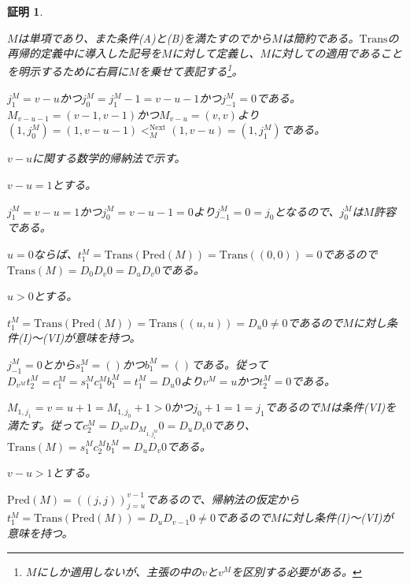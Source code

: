 \documentclass[dvipdfmx,uplatex]{jsarticle}
\theoremstyle{customnonumberbreakfortheorem}
\theoremstyle{customnonumberbreakforproof}
\newtheorem{hideableproof}{証明}
\begin{document}
\begin{hideableproof}
	\begin{indented}
		\item \(M\)は単項であり、また条件(A)と(B)を満たすのでから\(M\)は簡約である。\(\textrm{Trans}\)の再帰的定義中に導入した記号を\(M\)に対して定義し、\(M\)に対しての適用であることを明示するために右肩に\(M\)を乗せて表記する\footnote{\(M\)にしか適用しないが、主張の中の\(v\)と\(v^M\)を区別する必要がある。}。
		\item \(j_1^M = v-u\)かつ\(j_0^M = j_1^M-1 = v-u-1\)かつ\(j_{-1}^M = 0\)である。\(M_{v-u-1} = (v-1,v-1)\)かつ\(M_{v-u} = (v,v)\)より\((1,j_0^M) = (1,v-u-1) <_M^{\textrm{Next}} (1,v-u) = (1,j_1^M)\)である。
		\item \(v-u\)に関する数学的帰納法で示す。
		\item \(v-u = 1\)とする。
		\begin{indented}
			\item \(j_1^M = v-u = 1\)かつ\(j_0^M = v-u-1 = 0\)より\(j_{-1}^M = 0 = j_0\)となるので、\(j_0^M\)は\(M\)許容である。
			\item \(u = 0\)ならば、\(t_1^M = \textrm{Trans}(\textrm{Pred}(M)) = \textrm{Trans}((0,0)) = 0\)であるので\(\textrm{Trans}(M) = D_0 D_v 0 = D_u D_v 0\)である。
			\item \(u > 0\)とする。
			\begin{indented}
				\item \(t_1^M = \textrm{Trans}(\textrm{Pred}(M)) = \textrm{Trans}((u,u)) = D_u 0 \neq 0\)であるので\(M\)に対し条件(I)～(VI)が意味を持つ。
				\item \(j_{-1}^M = 0\)とから\(s_1^M = ()\)かつ\(b_1^M = ()\)である。従って\(D_{v^M} t_2^M = c_1^M = s_1^M c_1^M b_1^M = t_1^M = D_u 0\)より\(v^M = u\)かつ\(t_2^M = 0\)である。
				\item \(M_{1,j_1} = v = u+1 = M_{1,j_0}+1 > 0\)かつ\(j_0+1 = 1 = j_1\)であるので\(M\)は条件(VI)を満たす。従って\(c_2^M = D_{v^M} D_{M_{1,j_1^M}} 0 = D_u D_v 0\)であり、\(\textrm{Trans}(M) = s_1^M c_2^M b_1^M = D_u D_v 0\)である。
			\end{indented}
		\end{indented}
		\item \(v-u > 1\)とする。
		\begin{indented}
			\item \(\textrm{Pred}(M) = ((j,j))_{j=u}^{v-1}\)であるので、帰納法の仮定から\(t_1^M = \textrm{Trans}(\textrm{Pred}(M)) = D_u D_{v-1} 0 \neq 0\)であるので\(M\)に対し条件(I)～(VI)が意味を持つ。

\end{indented}
\end{indented}
\end{hideableproof}
\end{document}
